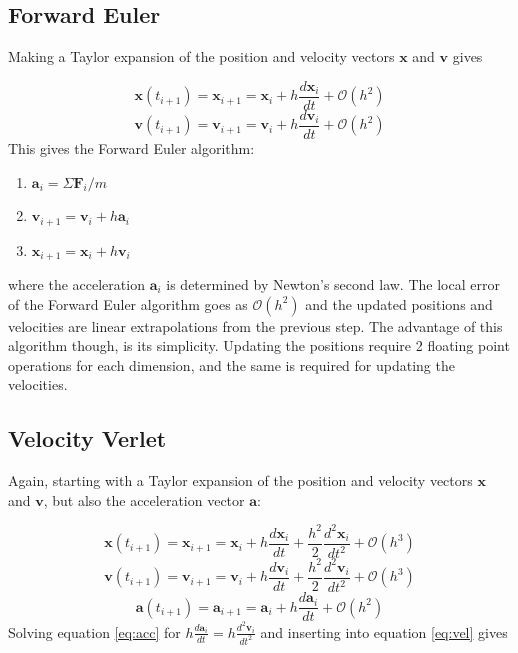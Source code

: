 \documentclass{article}
\begin{document}
\subsection{Forward Euler}
\label{sec:euler}
Making a Taylor expansion of the position and velocity vectors $\bm{x}$ and $\bm{v}$ gives

\begin{equation}
\bm{x}(t_{i+1}) = \bm{x}_{i+1} = \bm{x}_i + h\frac{d\bm{x}_i}{dt} + \mathcal{O}(h^2)
\end{equation}
\begin{equation} 
\bm{v}(t_{i+1}) = \bm{v}_{i+1} = \bm{v}_i + h\frac{d\bm{v}_i}{dt} + \mathcal{O}(h^2)
\end{equation} 
This gives the Forward Euler algorithm:
\begin{enumerate}
\item $\bm{a}_i = \Sigma\bm{F}_i/m$
\item $\bm{v}_{i+1} = \bm{v}_i + h\bm{a}_i$
\item $\bm{x}_{i+1} = \bm{x}_i + h\bm{v}_i$
\end{enumerate}
where the acceleration $\bm{a}_i$ is determined by Newton's second law. The local error of the Forward Euler algorithm goes as $\mathcal{O}(h^2)$ and the updated positions and velocities are linear extrapolations from the previous step. The advantage of this algorithm though, is its simplicity. Updating the positions require 2 floating point operations for each dimension, and the same is required for updating the velocities.

\subsection{Velocity Verlet}
\label{sec:verlet}
Again, starting with a Taylor expansion of the position and velocity vectors $\bm{x}$ and $\bm{v}$, but also the acceleration vector $\bm{a}$:

\begin{equation}
\bm{x}(t_{i+1}) = \bm{x}_{i+1} = \bm{x}_i + h\frac{d\bm{x}_i}{dt} + \frac{h^2}{2}\frac{d^2\bm{x}_i}{dt^2} + \mathcal{O}(h^3)
\end{equation}
\begin{equation} 
\bm{v}(t_{i+1}) = \bm{v}_{i+1} = \bm{v}_i + h\frac{d\bm{v}_i}{dt} + \frac{h^2}{2}\frac{d^2\bm{v}_i}{dt^2} + \mathcal{O}(h^3)
\label{eq:vel}
\end{equation} 
\begin{equation} 
\bm{a}(t_{i+1}) = \bm{a}_{i+1} = \bm{a}_i + h\frac{d\bm{a}_i}{dt} + \mathcal{O}(h^2)
\label{eq:acc}
\end{equation}
Solving equation \ref{eq:acc} for $h\frac{d\bm{a}_i}{dt} = h\frac{d^2\bm{v}_i}{dt^2}$ and inserting into equation \ref{eq:vel} gives 
\end{document}
